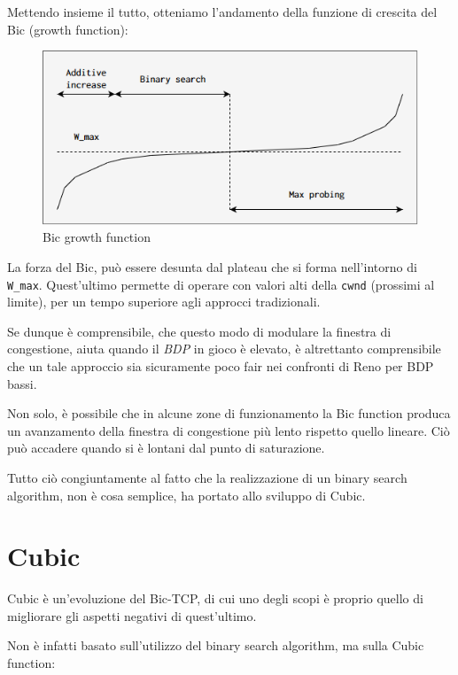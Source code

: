 Mettendo insieme il tutto, otteniamo l'andamento della funzione di crescita del Bic (growth function):

\begin{figure} [H]

\center
\caption{Bic growth function}
\includegraphics[scale=0.8]{chapters/A_cubic/img/growth_function.png}

\end{figure}

La forza del Bic, può essere desunta dal plateau che si forma nell'intorno di \texttt{W\_max}. Quest'ultimo permette di operare con valori alti della \texttt{cwnd} (prossimi al limite), per un tempo superiore agli approcci tradizionali. \bigskip

Se dunque è comprensibile, che questo modo di modulare la finestra di congestione, aiuta quando il \textit{BDP} in gioco è elevato, è altrettanto comprensibile che un tale approccio sia sicuramente poco fair nei confronti di Reno per BDP bassi. \bigskip 

Non solo, è possibile che in alcune zone di funzionamento la Bic function produca un avanzamento della finestra di congestione più lento rispetto quello lineare. Ciò può accadere quando si è lontani dal punto di saturazione. \bigskip

Tutto ciò congiuntamente al fatto che la realizzazione di un binary search algorithm, non è cosa semplice, ha portato allo sviluppo di Cubic.

\section{Cubic}

Cubic è un'evoluzione del Bic-TCP, di cui uno degli scopi è proprio quello di migliorare gli aspetti negativi di quest'ultimo. \bigskip

Non è infatti basato sull'utilizzo del binary search algorithm, ma sulla Cubic function:

